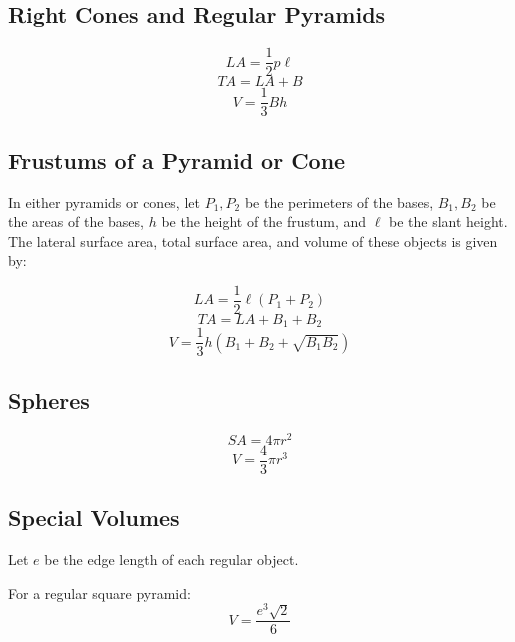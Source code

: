 \documentclass[draft, letterpaper, 12pt]{article}
\begin{document}
	\subsection{Right Cones and Regular Pyramids}\label{sec: looking at the aspects of the pyramids/cones}
		\begin{equation}
			LA = \frac{1}{2}p\ell
		\end{equation}
		\begin{equation}
			TA = LA+B
		\end{equation}
		\begin{equation}
			V = \frac{1}{3}Bh
		\end{equation}
	\subsection{Frustums of a Pyramid or Cone}\label{sec: the special formulae relating to frustums}
		In either pyramids or cones, let $P_1, P_2$ be the perimeters of the bases, $B_1, B_2$ be the areas of the bases, $h$ be the height of the frustum, and $\ell$ be the slant height. The lateral surface area, total surface area, and volume of these objects is given by:
		
		\begin{equation}
			LA = \frac{1}{2}{\ell}(P_1 + P_2)
		\end{equation}
		\begin{equation}
			TA = LA + B_1 + B_2
		\end{equation}
		\begin{equation}
			V = \frac{1}{3}h\left(B_1 + B_2 + \sqrt{B_1 B_2}\right)
		\end{equation}
	\subsection{Spheres}\label{sec: properties of a sphere}
		\begin{equation}
			SA = 4\pi r^2
		\end{equation}
		\begin{equation}
			V = \frac{4}{3}\pi r^3
		\end{equation}
	\subsection{Special Volumes}\label{sec: volumes of regular square pyramid, regular octahedron, regular tetrahedron}
		Let $e$ be the edge length of each regular object.
		
		For a regular square pyramid:
		\begin{equation}
			V = \frac{e^3\sqrt{2}}{6}
		\end{equation}
		
\end{document}
